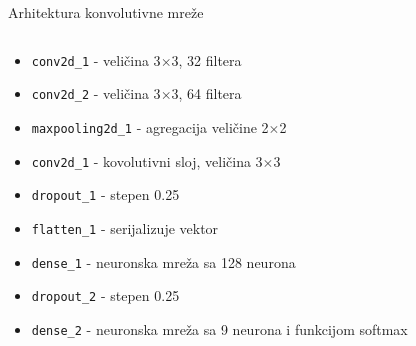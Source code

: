 \documentclass{beamer}
\begin{document}
\begin{frame}{Arhitektura konvolutivne mreže}
    \begin{columns}
    \begin{column}{0.75\textwidth}
        \begin{itemize}
            \item \texttt{conv2d\_1} - veličina 3$\times$3, 32 filtera
            \item \texttt{conv2d\_2} - veličina 3$\times$3, 64 filtera
            \item \texttt{max\-pooling2d\_1} - agregacija veličine 2$\times$2
            \item \texttt{conv2d\_1} - kovolutivni sloj, veličina 3$\times$3
            \item \texttt{dropout\_1} - stepen 0.25 \cite{dropout}
            \item \texttt{flatten\_1} - serijalizuje vektor
            \item \texttt{dense\_1} - neuronska mreža sa 128 neurona 
            \item \texttt{dropout\_2} - stepen 0.25
            \item \texttt{dense\_2} - neuronska mreža sa 9 neurona i funkcijom softmax
        \end{itemize}
    \end{column}
    \begin{column}{0.25\textwidth}  %
        \begin{center}

\end{center}
\end{column}
\end{columns}
\end{frame}
\end{document}
